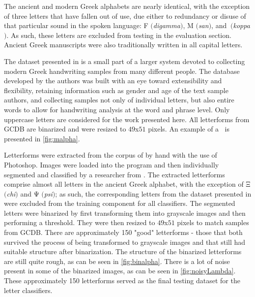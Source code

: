 \documentclass[10pt,twocolumn,letterpaper]{article}
\newcommand\Koppa{\begingroup\fontencoding{LGR}\selectfont\char21\endgroup}
\begin{document}
The ancient and modern Greek alphabets are nearly identical, with the exception of three letters that have fallen out of use, due either to redundancy or disuse of that particular sound in the spoken language: F $($\textit{digamma}$)$, M $($\textit{san}$)$, and \Koppa$\:($\textit{koppa}$)$. As such, these letters are excluded from testing in the evaluation section. Ancient Greek manuscripts were also traditionally written in all capital letters.

The dataset presented in \cite{GCDB} is a small part of a larger system devoted to collecting modern Greek handwriting samples from many different people. The database developed by the authors was built with an eye toward extensibility and flexibility, retaining information such as gender and age of the text sample authors, and collecting samples not only of individual letters, but also entire words to allow for handwriting analysis at the word and phrase level. Only uppercase letters are considered for the work presented here. All letterforms from GCDB are binarized and were resized to $49$x$51$ pixels. An example of a \textAlpha$\:$ is presented in \ref{fig:malpha}.

Letterforms were extracted from the corpus of \cite{BYU} by hand with the use of Photoshop. Images were loaded into the program and then individually segmented and classified by a researcher from \cite{VisCenter}. The extracted letterforms comprise almost all letters in the ancient Greek alphabet, with the exception of Ξ $($\textit{chi}$)$ and Ψ $($\textit{psi}$)$; as such, the corresponding letters from the dataset presented in \cite{GCDB} were excluded from the training component for all classifiers. The segmented letters were binarized by first transforming them into grayscale images and then performing a threshold. They were then resized to $49$x$51$ pixels to match samples from GCDB. There are approximately 150 "good" letterforms - those that both survived the process of being transformed to grayscale images and that still had suitable structure after binarization. The structure of the binarized letterforms are still quite rough, as can be seen in \ref{fig:binalpha}. There is a lot of noise present in some of the binarized images, as can be seen in \ref{fig:noisyLambda}. These approximately 150 letterforms served as the final testing dataset for the letter classifiers.
\end{document}
